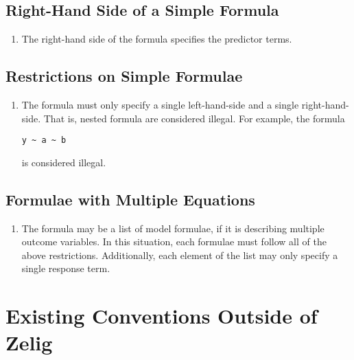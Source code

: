 \documentclass{article}
\begin{document}
\subsection{Right-Hand Side of a Simple Formula}
\label{subsec:rhs}

\begin{enumerate}

  \item The right-hand side of the formula specifies the predictor terms.

\end{enumerate}

\subsection{Restrictions on Simple Formulae}
\label{subsec:restriction-simple-formula}

\begin{enumerate}

  \item The formula must only specify a single left-hand-side and a single
    right-hand-side. That is, nested formula are considered illegal. For
    example, the formula \begin{verbatim}y ~ a ~ b\end{verbatim} is considered 
    illegal.

\end{enumerate}


\subsection{Formulae with Multiple Equations}

\begin{enumerate}

  \item The formula may be a list of model formulae, if it is describing
    multiple outcome variables. In this situation, each formulae must follow
    all of the above restrictions. Additionally, each element of the list may
    only specify a single response term.

\end{enumerate}



%
%
%
\section{Existing Conventions Outside of Zelig}
\label{sec:existing-elsewhere}
\end{document}
